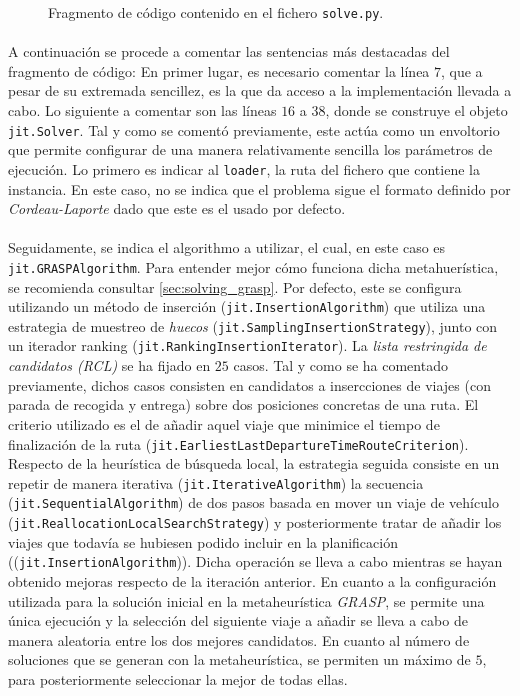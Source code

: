 \documentclass{subfiles}
\begin{document}
        \begin{figure}[!hb]
          \centering
          \inputminted[frame=single,framesep=10pt,linenos]{python}{./code/solve.py}
          \caption{Fragmento de código contenido en el fichero \texttt{solve.py}.}
          \label{code:solve}
        \end{figure}

        \paragraph{}
        A continuación se procede a comentar las sentencias más destacadas del fragmento de código: En primer lugar, es necesario comentar la línea $7$, que a pesar de su extremada sencillez, es la que da acceso a la implementación llevada a cabo. Lo siguiente a comentar son las líneas $16$ a $38$, donde se construye el objeto \texttt{jit.Solver}. Tal y como se comentó previamente, este actúa como un envoltorio que permite configurar de una manera relativamente sencilla los parámetros de ejecución. Lo primero es indicar al \texttt{loader}, la ruta del fichero que contiene la instancia. En este caso, no se indica que el problema sigue el formato definido por \emph{Cordeau-Laporte} dado que este es el usado por defecto.

        \paragraph{}
        Seguidamente, se indica el algorithmo a utilizar, el cual, en este caso es \texttt{jit.GRASPAlgorithm}. Para entender mejor cómo funciona dicha metahuerística, se recomienda consultar \cref{sec:solving_grasp}. Por defecto, este se configura utilizando un método de inserción (\texttt{jit.InsertionAlgorithm}) que utiliza una estrategia de muestreo de \emph{huecos} (\texttt{jit.SamplingInsertionStrategy}), junto con un iterador ranking (\texttt{jit.RankingInsertionIterator}). La \emph{lista restringida de candidatos (RCL)} se ha fijado en $25$ casos. Tal y como se ha comentado previamente, dichos casos consisten en candidatos a insercciones de viajes (con parada de recogida y entrega) sobre dos posiciones concretas de una ruta. El criterio utilizado es el de añadir aquel viaje que minimice el tiempo de finalización de la ruta (\texttt{jit.EarliestLastDepartureTimeRouteCriterion}). Respecto de la heurística de búsqueda local, la estrategia seguida consiste en un repetir de manera iterativa (\texttt{jit.IterativeAlgorithm}) la secuencia (\texttt{jit.SequentialAlgorithm}) de dos pasos basada en mover un viaje de vehículo (\texttt{jit.ReallocationLocalSearchStrategy}) y posteriormente tratar de añadir los viajes que todavía se hubiesen podido incluir en la planificación ((\texttt{jit.InsertionAlgorithm})). Dicha operación se lleva a cabo mientras se hayan obtenido mejoras respecto de la iteración anterior. En cuanto a la configuración utilizada para la solución inicial en la metaheurística \emph{GRASP}, se permite una única ejecución y la selección del siguiente viaje a añadir se lleva a cabo de manera aleatoria entre los dos mejores candidatos. En cuanto al número de soluciones que se generan con la metaheurística, se permiten un máximo de $5$, para posteriormente seleccionar la mejor de todas ellas. 
\end{document}
